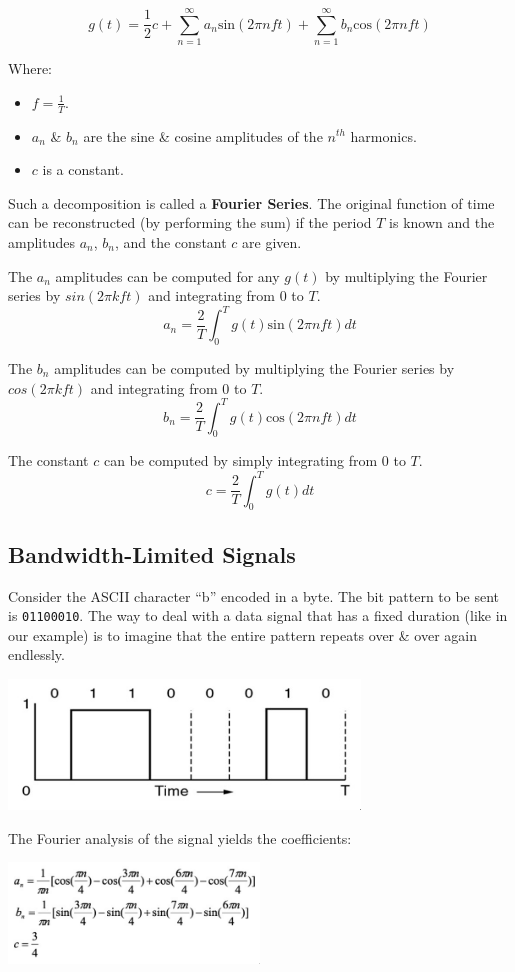 \documentclass[11pt]{article}
\begin{document}
\[
    g(t) = \frac{1}{2}c + \sum^\infty_{n=1} a_n \text{sin}(2\pi n f t) + \sum^\infty_{n=1} b_n \text{cos} (2 \pi n f t) 
\]

Where: 
\begin{itemize}
    \item $f = \frac{1}{T}$.
    \item $a_n$ \& $b_n$ are the sine \& cosine amplitudes of the $n^{th}$ harmonics. 
    \item $c$ is a constant. 
\end{itemize}

Such a decomposition is called a \textbf{Fourier Series}.
The original function of time can be reconstructed (by performing the sum) if the period $T$ is known and the amplitudes $a_n$, $b_n$, and the constant $c$ are given. 

The $a_n$ amplitudes can be computed for any $g(t)$ by multiplying the Fourier series by $sin(2 \pi k f t)$ and integrating from $0$ to $T$. 
\[ 
    a_n = \frac{2}{T} \int^T_0 g(t)\text{sin}(2 \pi n f t)dt
\] 

The $b_n$ amplitudes can be computed by multiplying the Fourier series by $cos(2 \pi k f t)$ and integrating from $0$ to $T$. 
\[
    b_n = \frac{2}{T} \int^T_0 g(t)\text{cos}(2 \pi n f t)dt
\]

The constant $c$ can be computed by simply integrating from $0$ to $T$. 
\[
    c = \frac{2}{T} \int^T_0 g(t)dt 
\] 

\newpage
\subsection{Bandwidth-Limited Signals} 
Consider the ASCII character ``b'' encoded in a byte. 
The bit pattern to be sent is \verb|01100010|. 
The way to deal with a data signal that has a fixed duration (like in our example) is to imagine that the entire pattern repeats over \& over again endlessly. 

\begin{center}
    \includegraphics[width=0.7\textwidth]{b.png}
\end{center}

The Fourier analysis of the signal yields the coefficients: 
\begin{center}
    \includegraphics[width=0.5\textwidth]{fouriercoefficients.png}
\end{center}
\end{document}
